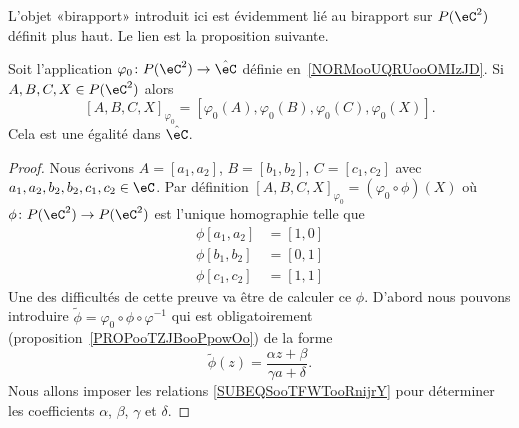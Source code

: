 L'objet «birapport» introduit ici est évidemment lié au birapport sur \( P(\eC^2)\) définit plus haut. Le lien est la proposition suivante.

\begin{proposition}     \label{PROPooLKQQooEOrjwC}
    Soit l'application \( \varphi_0\colon P(\eC^2)\to \hat\eC\) définie en~\ref{NORMooUQRUooOMIzJD}. Si \( A,B,C,X\in P(\eC^2) \) alors
    \begin{equation}        \label{EQooEOZZooMRHJfH}
        [A,B,C,X]_{\varphi_0}=[\varphi_0(A),\varphi_0(B),\varphi_0(C),\varphi_0(X)].
    \end{equation}
    Cela est une égalité dans \( \hat \eC\).
\end{proposition}

\begin{proof}
    Nous écrivons \( A=[a_1,a_2]\), \( B=[b_1,b_2]\), \( C=[c_1,c_2]\) avec \( a_1,a_2,b_2,b_2,c_1,c_2\in \eC\). Par définition \( [A,B,C,X]_{\varphi_0}=(\varphi_0\circ\phi)(X)\) où \( \phi\colon P(\eC^2)\to P(\eC^2)\) est l'unique homographie telle que
    \begin{subequations}        \label{SUBEQSooTFWTooRnijrY}
        \begin{align}
            \phi[a_1,a_2]&=[1,0]\\
            \phi[b_1,b_2]&=[0,1]\\
            \phi[c_1,c_2]&=[1,1]
        \end{align}
    \end{subequations}
    Une des difficultés de cette preuve va être de calculer ce \( \phi\). D'abord nous pouvons introduire \( \tilde \phi=\varphi_0\circ\phi\circ\varphi^{-1}\) qui est obligatoirement (proposition~\ref{PROPooTZJBooPpowOo}) de la forme
    \begin{equation}
        \tilde \phi(z)=\frac{ \alpha z+\beta }{ \gamma a+\delta }.
    \end{equation}
    Nous allons imposer les relations \eqref{SUBEQSooTFWTooRnijrY} pour déterminer les coefficients \( \alpha\), \( \beta\), \( \gamma\) et \( \delta\).


\end{proof}
